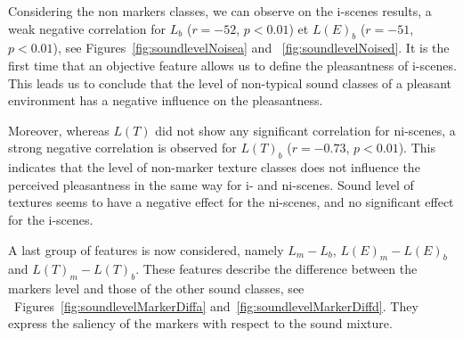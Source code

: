 \documentclass[12pt]{elsarticle}
\newcommand{\cf}{cf.}
\begin{document}
Considering the non markers classes, we can observe on the i-scenes results, a weak negative correlation for $L_b$  ($r=-52$, $p<0.01$) et $L(E)_b$ ($r=-51$, $p<0.01$), see Figures~\ref{fig:soundlevelNoisea}  and ~\ref{fig:soundlevelNoised}. It is the first time that an objective feature allows us to define the pleasantness of i-scenes. This leads us to conclude that the level of non-typical sound classes of a pleasant environment has a negative influence on the pleasantness.


Moreover, whereas $L(T)$ did not show any significant correlation for ni-scenes, a strong negative correlation is observed for $L(T)_b$ ($r = -0.73$, $p < 0.01$). This indicates that the level of non-marker texture classes does not influence the perceived pleasantness in the same way for i- and ni-scenes. Sound level of textures seems to have a negative effect for the ni-scenes, and no significant effect for the i-scenes.


A last group of features is now considered, namely $L_m-L_b$, $L(E)_m-L(E)_b$ and $L(T)_m-L(T)_b$.  These features describe the difference between the markers level and those of the other sound classes, see ~Figures~\ref{fig:soundlevelMarkerDiffa} and~\ref{fig:soundlevelMarkerDiffd}. They express the saliency of the markers with respect to the sound mixture.

\end{document}
